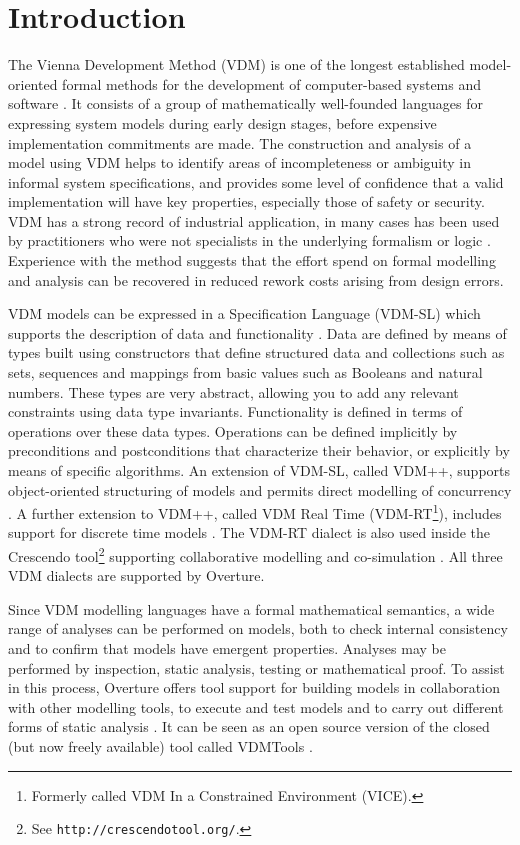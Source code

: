 \documentclass{overturerepchap}
\newcommand{\url}[1]{\texttt{#1}}
\begin{document}
\chapter{Introduction}

The Vienna Development Method (VDM) is one of the longest established
model-oriented formal methods for the development of computer-based
systems and software
\cite{Bjorner&78,Jones90a,Fitzgerald&08c}. It consists of a
group of mathematically well-founded languages for expressing system
models during early design stages, before expensive implementation
commitments are made. The construction and analysis of a model using
VDM helps to identify areas of incompleteness or ambiguity in
informal system specifications, and provides some level of confidence
that a valid implementation will have key properties, especially those
of safety or security. VDM has a strong record of industrial
application, in many cases has been used
by practitioners who were not specialists in
the underlying formalism or logic
\cite{Larsen&96b,Clement&99,Kurita&09}. Experience with the method
suggests that the effort spend on formal modelling and analysis can
be recovered in reduced rework costs arising from design errors.

VDM models can be expressed in a Specification Language (VDM-SL) which
supports the description of data and functionality
\cite{ISOVDM96a,Fitzgerald&98b,Fitzgerald&09}. Data are defined by
means of types built using constructors that define structured data
and collections such as sets, sequences and mappings from basic values
such as Booleans and natural numbers. These types are very abstract,
allowing you to add any relevant constraints using data type
invariants. Functionality is defined in terms of operations over these
data types. Operations can be defined implicitly by preconditions and
postconditions that characterize their behavior, or explicitly by
means of specific algorithms. An extension of VDM-SL, called VDM++,
supports object-oriented structuring of models and permits direct
modelling of concurrency \cite{Fitzgerald&05}. A further extension
to VDM++, called VDM Real Time (VDM-RT\footnote{Formerly called VDM In a
Constrained Environment (VICE).}), includes support for discrete
time models \cite{Mukherjee&00,Verhoef&06b}. The VDM-RT dialect is also used inside 
the Crescendo tool\footnote{See \url{http://crescendotool.org/}.} supporting collaborative modelling and co-simulation \cite{Fitzgerald&14c}. All
three VDM dialects are supported by Overture.

Since VDM modelling languages have a formal mathematical semantics,
a wide range of ana\-ly\-ses can be performed on models, both to check
internal consistency and to confirm that models have emergent
properties. Analyses may be performed by inspection, static analysis,
testing or mathematical proof. To assist in this process, Overture
offers tool support for building models in collaboration with other
modelling tools, to execute and test models and to carry out different
forms of static analysis \cite{Larsen&13b}. It can be seen as an open
source version of the closed (but now freely available) tool called VDMTools
\cite{Elmstrom&94,Larsen01,Fitzgerald&08a}.
\end{document}
